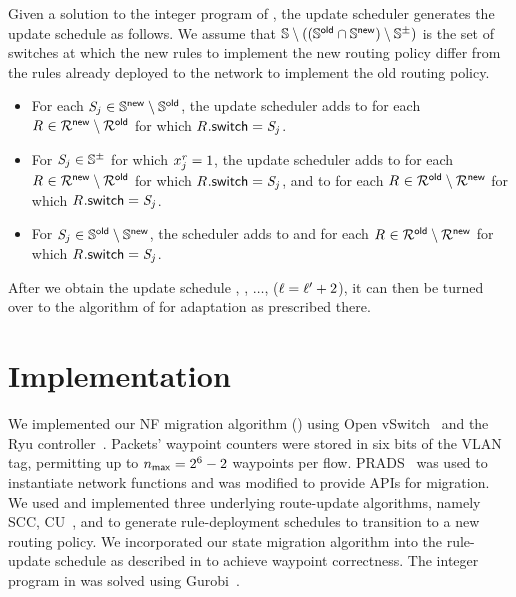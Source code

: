 Given a solution to the integer program of , the
update scheduler generates the update schedule as follows.  We assume
that $\mathbb{S} \setminus ((\mathbb{S}^{\mathsf{old}} \cap \mathbb{S}^{\mathsf{new}})
\setminus \mathbb{S}^{\pm})$ is the set of switches at which the
new rules \newRules to implement the new routing policy differ from
the rules \oldRules already deployed to the network to implement the
old routing policy.
\begin{itemize}[nosep,leftmargin=1em,labelwidth=*,align=left]
\item For each $\switchID{\switchIdx} \in \newSwitchesSet
  \setminus \oldSwitchesSet$, the update scheduler adds
   to  for each
  $\ruleID{} \in \newRules\setminus\oldRules$ for which
  $\ruleID{}{\switchField} = \switchID{\switchIdx}$.

\item For $\switchID{\switchIdx} \in \switchesWLinkSwapSet$ for
  which $x^{\mathit{r}}_{j} = 1$, the update
  scheduler adds  to
   for each $\ruleID{} \in
  \newRules\setminus\oldRules$ for which $\ruleID{}{\switchField} =
  \switchID{\switchIdx}$, and  to
   for each $\ruleID{} \in
  \oldRules\setminus\newRules$ for which $\ruleID{}{\switchField} =
  \switchID{\switchIdx}$.

\item For $\switchID{\switchIdx} \in \oldSwitchesSet \setminus
  \newSwitchesSet$, the scheduler adds
   to  and for each $\ruleID{} \in \oldRules\setminus\newRules$ for
  which $\ruleID{}{\switchField} = \switchID{\switchIdx}$.
\end{itemize}
After we obtain the update schedule , ,
$\ldots$, \updateID{\updateSteps} ($\mathit{\ell} = \mathit{\ell'} + 2$), it can then be turned over to the algorithm of
 for adaptation as prescribed there.


\section{Implementation}
\label{sec:implementation}

We implemented our NF migration algorithm ()
using Open vSwitch~\cite{ovs} and the Ryu
controller~\cite{ryu}. Packets' waypoint counters were stored in six
bits of the VLAN tag, permitting up to $n_{\mathsf{max}} = 2^6 - 2$
waypoints per flow.  PRADS~\cite{prads} was used to instantiate
network functions and was modified to provide APIs for migration. We
used and implemented three underlying route-update algorithms, namely
SCC, CU~\cite{CU}, and \ourRouteUpdateName to generate
rule-deployment schedules to transition to a new routing policy. We
incorporated our state migration algorithm into the rule-update
schedule as described in  to achieve waypoint
correctness.  The \ourRouteUpdateName integer program in
 was solved using Gurobi~\cite{gurobi}.

